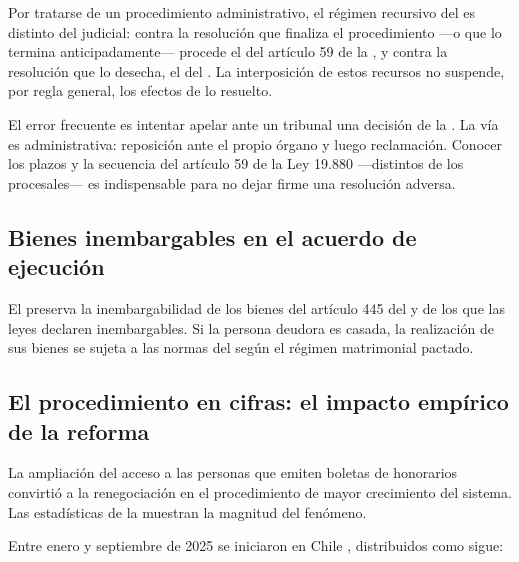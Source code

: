 Por tratarse de un procedimiento administrativo, el régimen recursivo del  es distinto
del judicial: contra la resolución que finaliza el procedimiento ---o que lo termina
anticipadamente--- procede el  del artículo 59 de
la , y contra la resolución que
lo desecha, el  del . La interposición de estos
recursos no suspende, por regla general, los efectos de lo resuelto.

\begin{foco}
El error frecuente es intentar apelar ante un tribunal una decisión de la \superir{}. La vía es
administrativa: reposición ante el propio órgano y luego reclamación. Conocer los plazos y la
secuencia del artículo 59 de la Ley 19.880 ---distintos de los procesales--- es indispensable para
no dejar firme una resolución adversa.
\end{foco}

\subsection{Bienes inembargables en el acuerdo de ejecución}

El  preserva la inembargabilidad de los bienes del artículo 445 del \cpc{} y de los que las leyes
declaren inembargables. Si la persona deudora es casada, la realización de sus bienes se sujeta a
las normas del \cc{} según el régimen matrimonial pactado.

\subsection{El procedimiento en cifras: el impacto empírico de la reforma}

La ampliación del acceso a las personas que emiten boletas de honorarios convirtió a la
renegociación en el procedimiento de mayor crecimiento del sistema. Las estadísticas de la
\superir{} \parencite{superir-estadisticas-2025} muestran la magnitud del fenómeno.

Entre enero y septiembre de 2025 se iniciaron en Chile , distribuidos como sigue:

